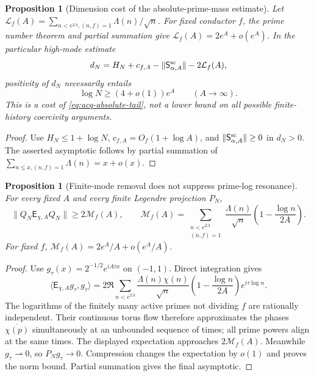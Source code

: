 \documentclass[11pt]{article}
\newtheorem{proposition}[theorem]{Proposition}
\theoremstyle{definition}
\theoremstyle{remark}
\begin{document}
\begin{proposition}[Dimension cost of the absolute-prime-mass estimate]
\label{prop:acq-dimension-cost}
Let
$\mathcal L_f(A)=\sum_{n<e^{2A},(n,f)=1}\Lambda(n)/\sqrt n$.
For fixed conductor $f$, the prime number theorem and partial summation
give $\mathcal L_f(A)=2e^A+o(e^A)$.  In the particular high-mode estimate
\begin{equation}
 d_N=H_N+c_{f,A}-\|\mathsf S_{\alpha,A}^{\rm sc}\|
                         -2\mathcal L_f(A),
 \label{eq:acq-absolute-tail}
\end{equation}
positivity of $d_N$ necessarily entails
\begin{equation}
 \log N\ge (4+o(1))e^A\qquad(A\longrightarrow\infty).
 \label{eq:acq-dimension-cost}
\end{equation}
This is a cost of \eqref{eq:acq-absolute-tail}, not a lower bound on all
possible finite-history coercivity arguments.
\end{proposition}

\begin{proof}
Use $H_N\le1+\log N$, $c_{f,A}=O_f(1+\log A)$, and
$\|\mathsf S_{\alpha,A}^{\rm sc}\|\ge0$ in $d_N>0$.
The asserted asymptotic follows by partial summation of
$\sum_{n\le x,(n,f)=1}\Lambda(n)=x+o(x)$.
\end{proof}

\begin{proposition}[Finite-mode removal does not suppress prime-log resonance]
\label{prop:acq-resonance}
For every fixed $A$ and every finite Legendre projection $P_N$,
\begin{equation}
 \|Q_N\mathsf E_{\chi,A}Q_N\|
 \ge2\mathcal M_f(A),\qquad
 \mathcal M_f(A)=\sum_{\substack{n<e^{2A}\\(n,f)=1}}
 \frac{\Lambda(n)}{\sqrt n}
 \left(1-\frac{\log n}{2A}\right).
 \label{eq:acq-resonance}
\end{equation}
For fixed $f$, $\mathcal M_f(A)=2e^A/A+o(e^A/A)$.
\end{proposition}

\begin{proof}
Use $g_\tau(x)=2^{-1/2}e^{iA\tau x}$ on $(-1,1)$.  Direct integration
gives
\[
 \langle\mathsf E_{\chi,A}g_\tau,g_\tau\rangle
 =2\Re\sum_{n<e^{2A}}\frac{\Lambda(n)\chi(n)}{\sqrt n}
 \left(1-\frac{\log n}{2A}\right)e^{i\tau\log n}.
\]
The logarithms of the finitely many active primes not dividing $f$ are
rationally independent.  Their continuous torus flow therefore
approximates the phases $\overline{\chi(p)}$ simultaneously at an
unbounded sequence of times; all prime powers align at the same times.
The displayed expectation approaches $2\mathcal M_f(A)$.
Meanwhile $g_\tau\rightharpoonup0$, so $P_Ng_\tau\to0$.
Compression changes the expectation by $o(1)$ and proves the norm bound.
Partial summation gives the final asymptotic.
\end{proof}
\end{document}
